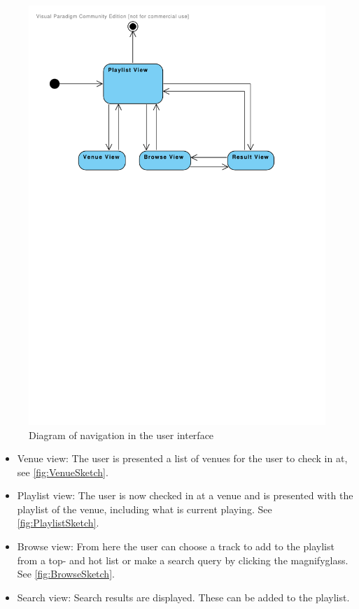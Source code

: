 \begin{figure}
  \centering
  \includegraphics[width=1.0\linewidth]{Images/UserInterface.pdf}
  \caption{Diagram of navigation in the user interface}\label{fig:UserInterface}
\end{figure}

\begin{itemize}
\item Venue view: The user is presented a list of venues for the user to check in at, see \cref{fig:VenueSketch}.
\item Playlist view: The user is now checked in at a venue and is presented with the playlist of the venue, including what is current playing. See \cref{fig:PlaylistSketch}.
\item Browse view: From here the user can choose a track to add to the playlist from a top- and hot list or make a search query by clicking the magnifyglass. See \cref{fig:BrowseSketch}.
\item Search view: Search results are displayed. These can be added to
  the playlist.
\end{itemize}

